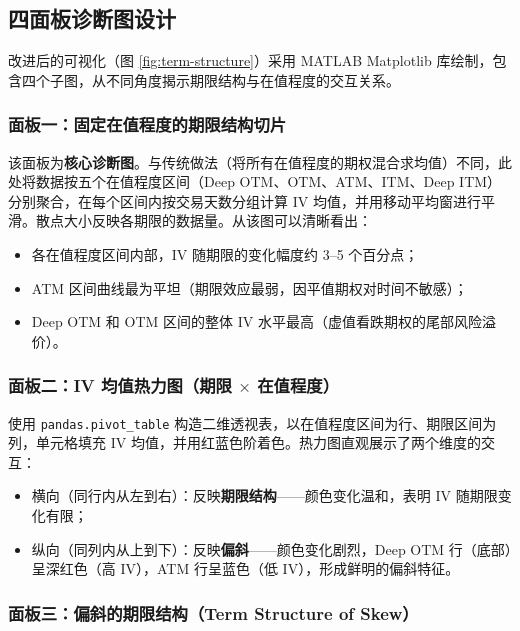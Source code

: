 \subsection{四面板诊断图设计}

改进后的可视化（图 \ref{fig:term-structure}）采用 MATLAB Matplotlib 库绘制，包含四个子图，从不同角度揭示期限结构与在值程度的交互关系。

\subsubsection{面板一：固定在值程度的期限结构切片}

该面板为\textbf{核心诊断图}。与传统做法（将所有在值程度的期权混合求均值）不同，此处将数据按五个在值程度区间（Deep OTM、OTM、ATM、ITM、Deep ITM）分别聚合，在每个区间内按交易天数分组计算 IV 均值，并用移动平均窗进行平滑。散点大小反映各期限的数据量。从该图可以清晰看出：

\begin{itemize}
    \item 各在值程度区间内部，IV 随期限的变化幅度约 3--5 个百分点；
    \item ATM 区间曲线最为平坦（期限效应最弱，因平值期权对时间不敏感）；
    \item Deep OTM 和 OTM 区间的整体 IV 水平最高（虚值看跌期权的尾部风险溢价）。
\end{itemize}

\subsubsection{面板二：IV 均值热力图（期限 $\times$ 在值程度）}

使用 \texttt{pandas.pivot\_table} 构造二维透视表，以在值程度区间为行、期限区间为列，单元格填充 IV 均值，并用红蓝色阶着色。热力图直观展示了两个维度的交互：

\begin{itemize}
    \item 横向（同行内从左到右）：反映\textbf{期限结构}——颜色变化温和，表明 IV 随期限变化有限；
    \item 纵向（同列内从上到下）：反映\textbf{偏斜}——颜色变化剧烈，Deep OTM 行（底部）呈深红色（高 IV），ATM 行呈蓝色（低 IV），形成鲜明的偏斜特征。
\end{itemize}

\subsubsection{面板三：偏斜的期限结构（Term Structure of Skew）}

